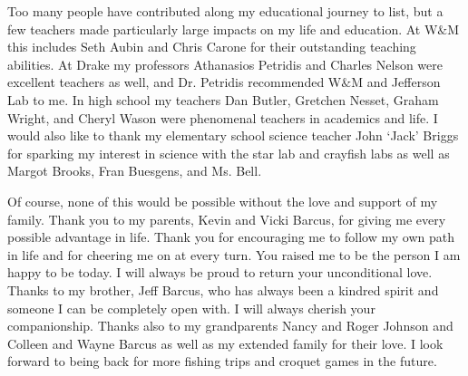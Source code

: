 \documentclass[../main.tex]{subfiles}
\begin{document}
\begin{singlespace}
{{Too many people have contributed along my educational journey to list, but a few teachers made particularly large impacts on my life and education. At W$\&$M this includes Seth Aubin and Chris Carone for their outstanding teaching abilities. At Drake my professors Athanasios Petridis and Charles Nelson were excellent teachers as well, and Dr. Petridis recommended W$\&$M and Jefferson Lab to me. In high school my teachers Dan Butler, Gretchen Nesset, Graham Wright, and Cheryl Wason were phenomenal teachers in academics and life. I would also like to thank my elementary school science teacher John `Jack' Briggs for sparking my interest in science with the star lab and crayfish labs as well as Margot Brooks, Fran Buesgens, and Ms. Bell. \\

} %

{\parindent0pt %
                                                                                 
Of course, none of this would be possible without the love and support of my family. Thank you to my parents, Kevin and Vicki Barcus, for giving me every possible advantage in life. Thank you for encouraging me to follow my own path in life and for cheering me on at every turn. You raised me to be the person I am happy to be today. I will always be proud to return your unconditional love. Thanks to my brother, Jeff Barcus, who has always been a kindred spirit and someone I can be completely open with. I will always cherish your companionship. Thanks also to my grandparents Nancy and Roger Johnson and Colleen and Wayne Barcus as well as my extended family for their love. I look forward to being back for more fishing trips and croquet games in the future.\\

} %

{\parindent0pt %
                                                                                 
}}
\end{singlespace}
\end{document}

